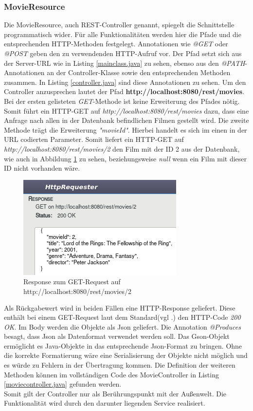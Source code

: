 \documentclass[fleqn,10.5pt,ngerman]{SelfArx}
\begin{document}
\subsubsection{MovieResource}
Die MovieResource, auch REST-Controller genannt, spiegelt die Schnittstelle programmatisch wider. Für alle Funktionalitäten werden hier die Pfade und die entsprechenden HTTP-Methoden festgelegt. Annotationen wie \textit{@GET} oder \textit{@POST} geben den zu verwendenden HTTP-Aufruf vor. Der Pfad setzt sich aus der Server-URL wie in Listing \ref{mainclass.java} zu sehen, ebenso aus den \textit{@PATH}-Annotationen an der Controller-Klasse sowie den entsprechenden Methoden zusammen. In Listing \ref{controller.java} sind diese Annotationen zu sehen. Um den Controller anzusprechen lautet der Pfad \textbf{http://localhost:8080/rest/movies}. Bei der ersten gelisteten \textit{GET}-Methode ist keine Erweiterung des Pfades nötig. Somit führt ein HTTP-GET auf \textit{http://localhost:8080/rest/movies} dazu, dass eine Anfrage nach allen in der Datenbank befindlichen Filmen gestellt wird. Die zweite Methode trägt die Erweiterung \textit{"movieId"}. Hierbei handelt es sich im einen in der URL codierten Parameter.  Somit liefert ein HTTP-GET auf \textit{http://localhost:8080/rest/movies/2} den Film mit der ID 2 aus der Datenbank, wie auch in Abbildung \ref{fig:responsebrowser} zu sehen, beziehungsweise \textit{null} wenn ein Film mit dieser ID nicht vorhanden wäre. 
\begin{figure}[ht]\centering
	\includegraphics[width=8.5 cm]{Abbildungen/getid2.jpg}
	\caption{Response zum GET-Request auf http://localhost:8080/rest/movies/2}
	\label{fig:responsebrowser}
\end{figure}

Als Rückgabewert wird in beiden Fällen eine HTTP-Response geliefert. Diese enthält bei einem GET-Request laut dem Standard(vgl .\cite{httpcodes}) den HTTP-Code \textit{200 OK}. Im Body werden die Objekte als Json geliefert. Die Annotation \textit{@Produces} besagt, dass Json als Datenformat verwendet werden soll. Das Gson-Objekt ermöglicht es Java-Objekte in das entsprechende Json-Format zu bringen. Ohne die korrekte Formatierung wäre eine Serialisierung der Objekte nicht möglich und es würde zu Fehlern in der Übertragung kommen. Die Definition der weiteren Methoden können im vollständigen Code des MovieController in Listing \ref{moviecontroller.java} gefunden werden. \\ Somit gilt der Controller nur als Berührungspunkt mit der Außenwelt. Die Funktionalität wird durch den darunter liegenden Service realisiert.
\end{document}
